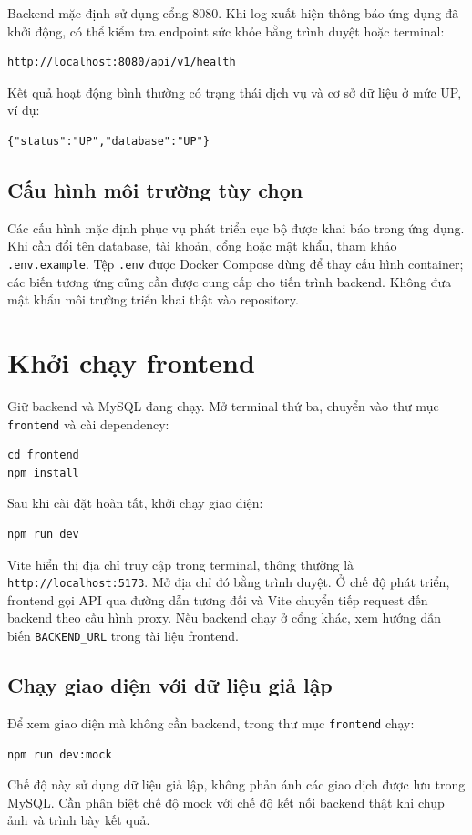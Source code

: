 Backend mặc định sử dụng cổng 8080. Khi log xuất hiện thông báo ứng dụng đã khởi động, có thể kiểm tra endpoint sức khỏe bằng trình duyệt hoặc terminal:
\begin{verbatim}
http://localhost:8080/api/v1/health
\end{verbatim}
Kết quả hoạt động bình thường có trạng thái dịch vụ và cơ sở dữ liệu ở mức UP, ví dụ:
\begin{verbatim}
{"status":"UP","database":"UP"}
\end{verbatim}

\subsection{Cấu hình môi trường tùy chọn}
Các cấu hình mặc định phục vụ phát triển cục bộ được khai báo trong ứng dụng. Khi cần đổi tên database, tài khoản, cổng hoặc mật khẩu, tham khảo \texttt{.env.example}. Tệp \texttt{.env} được Docker Compose dùng để thay cấu hình container; các biến tương ứng cũng cần được cung cấp cho tiến trình backend. Không đưa mật khẩu môi trường triển khai thật vào repository.

\section{Khởi chạy frontend}

Giữ backend và MySQL đang chạy. Mở terminal thứ ba, chuyển vào thư mục \texttt{frontend} và cài dependency:
\begin{verbatim}
cd frontend
npm install
\end{verbatim}

Sau khi cài đặt hoàn tất, khởi chạy giao diện:
\begin{verbatim}
npm run dev
\end{verbatim}

Vite hiển thị địa chỉ truy cập trong terminal, thông thường là \texttt{http://localhost:5173}. Mở địa chỉ đó bằng trình duyệt. Ở chế độ phát triển, frontend gọi API qua đường dẫn tương đối và Vite chuyển tiếp request đến backend theo cấu hình proxy. Nếu backend chạy ở cổng khác, xem hướng dẫn biến \texttt{BACKEND\_URL} trong tài liệu frontend.

\subsection{Chạy giao diện với dữ liệu giả lập}
Để xem giao diện mà không cần backend, trong thư mục \texttt{frontend} chạy:
\begin{verbatim}
npm run dev:mock
\end{verbatim}
Chế độ này sử dụng dữ liệu giả lập, không phản ánh các giao dịch được lưu trong MySQL. Cần phân biệt chế độ mock với chế độ kết nối backend thật khi chụp ảnh và trình bày kết quả.

